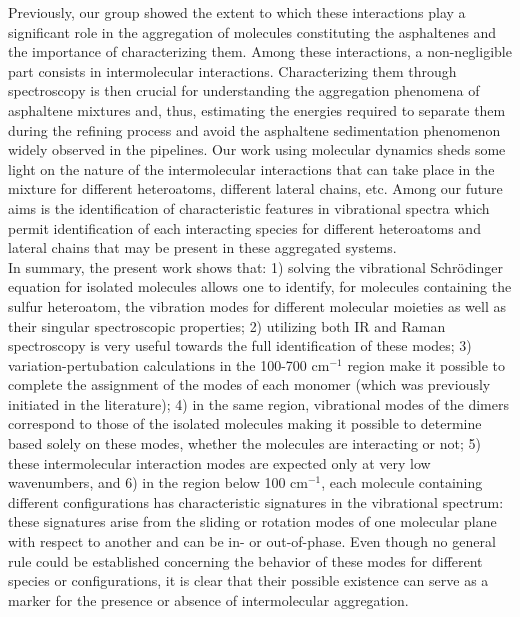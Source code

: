		Previously, our group showed the extent to which these interactions play a significant role in the aggregation of molecules constituting the asphaltenes and the importance of characterizing them.\cite{silva2016molecular} Among these interactions, a non-negligible part consists in intermolecular interactions. Characterizing them through spectroscopy is then crucial for understanding the aggregation phenomena of asphaltene mixtures and, thus, estimating the energies required to separate them during the refining process and avoid the asphaltene sedimentation phenomenon widely observed in the pipelines. Our work using molecular dynamics sheds some light on the nature of the intermolecular interactions that can take place in the mixture for different heteroatoms, different lateral chains, etc. Among our future aims is the identification of characteristic features in vibrational spectra which permit identification of each interacting species for different heteroatoms and lateral chains that may be present in these aggregated systems.\\
		
		In summary, the present work shows that: 1) solving the vibrational Schr\"{o}dinger equation for isolated molecules allows one to identify, for molecules containing the sulfur heteroatom, the vibration modes for different molecular moieties as well as their singular spectroscopic properties; 2) utilizing both IR and Raman spectroscopy is very useful towards the full identification of these modes; 3) variation-pertubation calculations in the 100-700 cm$^{-1}$ region make it possible to complete the assignment of the modes of each monomer (which was previously initiated in the literature); 4) in the same region, vibrational modes of the dimers correspond to those of the isolated molecules making it possible to determine based solely on these modes, whether the molecules are interacting or not; 5) these intermolecular interaction modes are expected only at very low wavenumbers, and 6) in the region below 100 cm$^{-1}$, each molecule containing different configurations has characteristic signatures in the vibrational spectrum: these signatures arise from the sliding or rotation modes of one molecular plane with respect to another and can be in- or out-of-phase. Even though no general rule could be established concerning the behavior of these modes for different species or configurations, it is clear that their possible existence can serve as a marker for the presence or absence of intermolecular aggregation.\\ 
		
